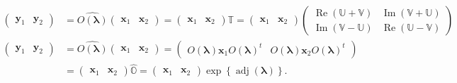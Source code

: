 \documentclass[aps, preprint]{revtex4}
\begin{document}
\begin{align}\left (\begin{array}{cc}\mathbf{y}_{1} & \mathbf{y}_{2}\end{array}\right ) &  =\widehat{O \left (\mathbf{\lambda }\right )} \left (\begin{array}{cc}\mathbf{x}_{1} & \mathbf{x}_{2}\end{array}\right ) =\left (\begin{array}{cc}\mathbf{x}_{1} & \mathbf{x}_{2}\end{array}\right ) \mathbb{T} =\left (\begin{array}{cc}\mathbf{x}_{1} & \mathbf{x}_{2}\end{array}\right ) \left (\begin{array}{cc}\ensuremath{\operatorname*{Re}} \left (\mathbb{U} +\mathbb{V}\right ) & \ensuremath{\operatorname*{Im}} \left (\mathbb{V} +\mathbb{U}\right ) \\
\ensuremath{\operatorname*{Im}} \left (\mathbb{V} -\mathbb{U}\right ) & \ensuremath{\operatorname*{Re}} \left (\mathbb{U} -\mathbb{V}\right )\end{array}\right ) \\
\left (\begin{array}{cc}\mathbf{y}_{1} & \mathbf{y}_{2}\end{array}\right ) &  =\widehat{O \left (\mathbf{\lambda }\right )} \left (\begin{array}{cc}\mathbf{x}_{1} & \mathbf{x}_{2}\end{array}\right ) =\left (\begin{array}{cc}O \left (\mathbf{\lambda }\right ) \mathbf{x}_{1} O \left (\mathbf{\lambda }\right )^{t} & O \left (\mathbf{\lambda }\right ) \mathbf{x}_{2} O \left (\mathbf{\lambda }\right )^{t}\end{array}\right ) \\
 &  =\left (\begin{array}{cc}\mathbf{x}_{1} & \mathbf{x}_{2}\end{array}\right ) \widehat{\mathbb{O}} =\left (\begin{array}{cc}\mathbf{x}_{1} & \mathbf{x}_{2}\end{array}\right ) \exp  \left \{\ensuremath{\operatorname*{adj}} \left (\mathbf{\lambda }\right )\right \}\text{.}\end{align}
\end{document}
